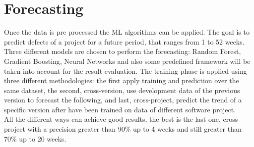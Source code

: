 \documentclass{article}
\begin{document}
\section{Forecasting}
Once the data is pre processed the ML algorithms can be applied. The goal is to predict defects of a project for a future period, that ranges from 1 to 52 weeks.
Three different models are chosen to perform the forecasting: Random Forest, Gradient Boosting, Neural Networks and also some predefined framework will be taken into account for the result evaluation.
The training phase is applied using three different methodologies: the first apply training and prediction over the same dataset, the second, cross-version, use development data of the previous version to forecast the following, and last, cross-project, predict the trend of a specific version after have been trained on data of different software project.\\
All the different ways can achieve good results, the best is the last one, cross-project with a precision greater than 90\% up to 4 weeks and still greater than 70\% up to 20 weeks. 
\end{document}
